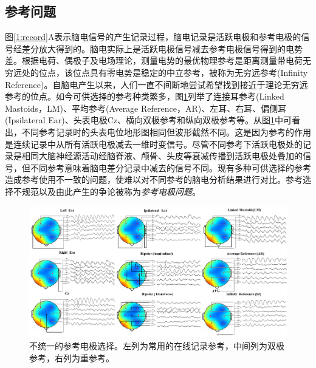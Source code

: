 \subsection{参考问题}
图\ref{1:record}A表示脑电信号的产生记录过程，脑电记录是活跃电极和参考电极的信号经差分放大得到的。脑电实际上是活跃电极信号减去参考电极信号得到的电势差。根据电荷、偶极子及电场理论，测量电势的最优物理参考是距离测量带电荷无穷远处的位点，该位点具有零电势是稳定的中立参考，被称为无穷远参考(Infinity Reference)。自脑电产生以来，人们一直不间断地尝试希望找到接近于理论无穷远参考的位点。如今可供选择的参考种类繁多，图\ref{1:ref}列举了连接耳参考(Linked Mastoids，LM)、平均参考(Average Reference，AR)、左耳、右耳、偏侧耳(Ipsilateral Ear)、头表电极Cz、横向双极参考和纵向双极参考等。从图\ref{1:ref}中可看出，不同参考记录时的头表电位地形图相同但波形截然不同。这是因为参考的作用是连续记录中从所有活跃电极减去一维时变信号。尽管不同参考下活跃电极处的记录是相同大脑神经源活动经脑脊液、颅骨、头皮等衰减传播到活跃电极处叠加的信号，但不同参考意味着脑电差分记录中减去的信号不同。现有多种可供选择的参考造成参考使用不一致的问题，使难以对不同参考的脑电分析结果进行对比。参考选择不规范以及由此产生的争论被称为\textit{参考电极问题}。
\begin{figure}[!h]
	\includegraphics[width=15cm]{pic/xulun/EEGref.png}
	\caption{不统一的参考电极选择。左列为常用的在线记录参考，中间列为双极参考，右列为重参考。}
	\label{1:ref}
\end{figure}

